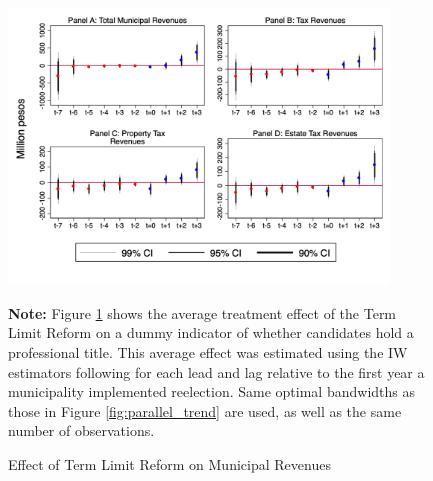 \documentclass[12pt]{amsart}
\numberwithin{equation}{section}
\theoremstyle{definition}
\theoremstyle{definition}
\theoremstyle{definition}
\begin{document}
\begin{figure}[h]   
\centering
 \caption{Effect of Term Limit Reform on Municipal Revenues}
 \label{fig:revenues1}
\includegraphics[width=0.9\textwidth]{../Figures/revenues_allyears1.png}
       \captionsetup{justification=centering}
         
 \textbf{Note:} Figure \ref{fig:revenues1} shows the average treatment effect of the Term Limit Reform on a dummy indicator of whether candidates hold a professional title. This average effect was estimated using the IW estimators following \citet{abraham_sun_2020} for each lead and lag relative to the first year a municipality implemented reelection. Same optimal bandwidths as those in Figure \ref{fig:parallel_trend} are used, as well as the same number of observations.  
       
\end{figure}   
\end{document}
